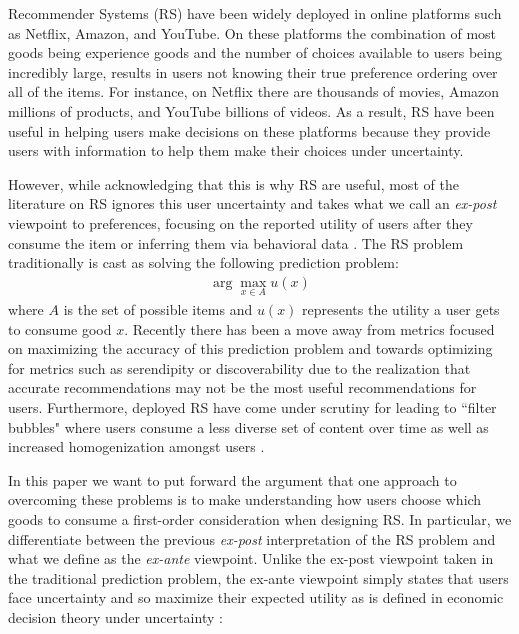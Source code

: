 \documentclass[sigconf]{acmart}
\begin{document}
Recommender Systems (RS) have been widely deployed in online platforms such as Netflix, Amazon, and YouTube. On these platforms the combination of most goods being experience goods and the number of choices available to users being incredibly large, results in users not knowing their true preference ordering over all of the items. For instance, on Netflix there are thousands of movies, Amazon millions of products, and YouTube billions of videos. As a result, RS have been useful in helping users make decisions on these platforms because they provide users with information to help them make their choices under uncertainty. 
\par
However, while acknowledging that this is why RS are useful, most of the literature on RS ignores this user uncertainty and takes what we call an \textit{ex-post} viewpoint to preferences, focusing on the reported utility of users after they consume the item or inferring them via behavioral data \cite{adomavicius2005toward, zhao2018interpreting}. The RS problem traditionally is cast as solving the following prediction problem:
\begin{align*}
\arg\max\limits_{x \in A} u(x)
\end{align*}
\noindent where $A$ is the set of possible items and $u(x)$ represents the utility a user gets to consume good $x$. Recently there has been a move away from metrics focused on maximizing the accuracy of this prediction problem and towards optimizing for metrics such as serendipity or discoverability \cite{mcnee2006being, vargas2011rank} due to  the realization that accurate recommendations may not be the most useful recommendations for users. Furthermore, deployed RS have come under scrutiny for leading to ``filter bubbles" \cite{pariser2011filter} where users consume a less diverse set of content over time as well as increased homogenization amongst users \cite{chaney2018algorithmic, hosanagar2013will}.
\par
In this paper we want to put forward the argument that one approach to overcoming these problems is to make understanding how users choose which goods to consume a first-order consideration when designing RS. In particular, we differentiate between the previous \textit{ex-post} interpretation of the RS problem and what we define as the \textit{ex-ante} viewpoint. Unlike the ex-post viewpoint taken in the traditional prediction problem, the ex-ante viewpoint simply states that users face uncertainty and so maximize their expected utility as is defined in economic decision theory under uncertainty \citep[see e.g.][]{mas1995microeconomic}:
\end{document}
